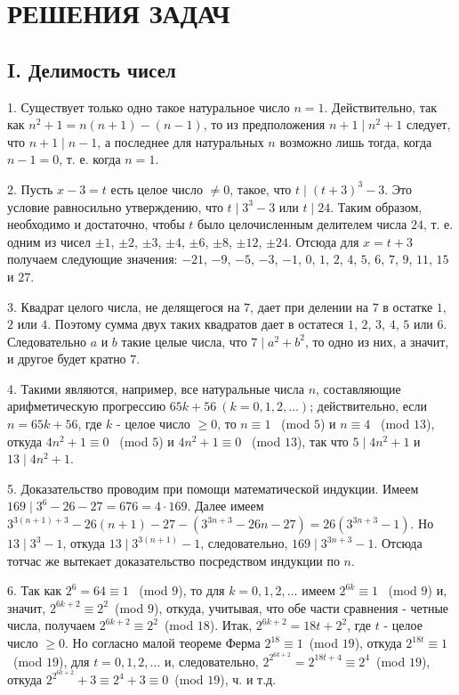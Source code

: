 \documentclass[12pt, a4paper, openany]{book}
\begin{document}
\newpage

\section[Решения задач]{\center РЕШЕНИЯ ЗАДАЧ}
\subsection[I. Делимость чисел]{\center I. Делимость чисел}

1. Существует только одно такое натуральное число $n=1$. Действительно, так как $n^2+1=n(n+1)-(n-1)$, то из предположения $n+1 \mid n^2+1$ следует, что $n+1 \mid n-1$, а последнее для натуральных $n$ возможно лишь тогда, когда $n-1=0$, т. е. когда $n=1$.

2. Пусть $x-3=t$ есть целое число $\neq0$, такое, что $t \mid (t+3)^3-3$. Это условие равносильно утверждению, что $t \mid 3^3-3$ или $t \mid 24$. Таким образом, необходимо и достаточно, чтобы $t$ было целочисленным делителем числа $24$, т. е. одним из чисел $\pm1$, $\pm2$, $\pm3$, $\pm4$, $\pm6$, $\pm8$, $\pm12$, $\pm24$. Отсюда для $x=t+3$ получаем следующие значения: $-21$, $-9$, $-5$, $-3$, $-1$, $0$, $1$, $2$, $4$, $5$, $6$, $7$, $9$, $11$, $15$ и $27$.

3. Квадрат целого числа, не делящегося на $7$, дает при делении на $7$ в остатке $1$, $2$ или $4$. Поэтому сумма двух таких квадратов дает в остатеся $1$, $2$, $3$, $4$, $5$ или $6$. Следовательно $a$ и $b$ такие целые числа, что $7 \mid a^2 + b^2$, то одно из них, а значит, и другое будет кратно $7$.

4. Такими являются, например, все натуральные числа $n$, составляющие арифметическую прогрессию $65k+56 \ (k=0, 1, 2, \ldots)$; действительно, если $n=65k+56$, где $k$ - целое число $\geqslant 0$, то $n \equiv 1$ \  (mod $5$) и $n \equiv 4$ \ (mod $13$), откуда $4n^2+1 \equiv 0$ \ (mod $5$) и $4n^2+1 \equiv 0$ \ (mod $13$), так что $5 \mid 4n^2+1$ и $13 \mid 4n^2+1$.

5. Доказательство проводим при помощи математической индукции. Имеем $169 \mid 3^6 - 26 - 27 = 676 = 4 \cdot  169$. Далее имеем $3^{3(n+1)+3} - 26 (n+1) - 27 - (3^{3n+3}-26n-27)=26(3^{3n+3}-1)$. Но $13 \mid 3^3-1$, откуда $13 \mid 3^{3(n+1)}-1$, следовательно, $169 \mid 3^{3n+3}-1$. Отсюда тотчас же вытекает доказательство посредством индукции по $n$.

6. Так как $2^6=64\equiv1$ \ (mod $9$), то для $k=0,1,2, \dots$ имеем $2^{6k}\equiv1$ \ (mod $9$) и, значит, $2^{6k+2}\equiv2^2$\ (mod $9$), откуда, учитывая, что обе части сравнения - четные числа, получаем $2^{6k+2}\equiv2^2$\ (mod $18$). Итак, $2^{6k+2}=18t+2^2$, где $t$ - целое число $\geqslant 0$. Но согласно малой теореме Ферма $2^{18}\equiv1$\ (mod $19$), откуда $2^{18t}\equiv1$\ (mod $19$), для $t=0,1,2, \dots$ и, следовательно, $\displaystyle 2^{2^{6k+2}}=2^{18t+4}\equiv2^4$\ (mod $19$), откуда $2^{2^{6k+2}}+3\equiv2^4+3\equiv0$\ (mod $19$), ч. и т.д.
\end{document}
